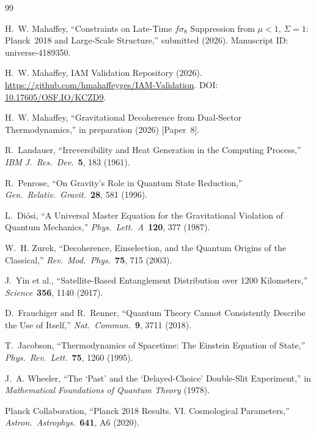 \documentclass[12pt,letterpaper]{article}
\begin{document}

\begin{thebibliography}{99}

H.~W. Mahaffey,
``Constraints on Late-Time $f\sigma_8$ Suppression from $\mu < 1$,
$\Sigma = 1$: Planck~2018 and Large-Scale Structure,''
submitted (2026). Manuscript ID: universe-4189350.

H.~W. Mahaffey,
IAM Validation Repository (2026).
\url{https://github.com/hmahaffeyges/IAM-Validation}.
DOI: \href{https://doi.org/10.17605/OSF.IO/KCZD9}{10.17605/OSF.IO/KCZD9}.

H.~W. Mahaffey,
``Gravitational Decoherence from Dual-Sector Thermodynamics,''
in preparation (2026) [Paper~8].

R.~Landauer,
``Irreversibility and Heat Generation in the Computing Process,''
\textit{IBM J.\ Res.\ Dev.}\ \textbf{5}, 183 (1961).

R.~Penrose,
``On Gravity's Role in Quantum State Reduction,''
\textit{Gen.\ Relativ.\ Gravit.}\ \textbf{28}, 581 (1996).

L.~Di\'{o}si,
``A Universal Master Equation for the Gravitational Violation of Quantum
Mechanics,''
\textit{Phys.\ Lett.\ A}\ \textbf{120}, 377 (1987).

W.~H. Zurek,
``Decoherence, Einselection, and the Quantum Origins of the Classical,''
\textit{Rev.\ Mod.\ Phys.}\ \textbf{75}, 715 (2003).

J.~Yin et al.,
``Satellite-Based Entanglement Distribution over 1200 Kilometers,''
\textit{Science}\ \textbf{356}, 1140 (2017).

D.~Frauchiger and R.~Renner,
``Quantum Theory Cannot Consistently Describe the Use of Itself,''
\textit{Nat.\ Commun.}\ \textbf{9}, 3711 (2018).

T.~Jacobson,
``Thermodynamics of Spacetime: The Einstein Equation of State,''
\textit{Phys.\ Rev.\ Lett.}\ \textbf{75}, 1260 (1995).

J.~A. Wheeler,
``The `Past' and the `Delayed-Choice' Double-Slit Experiment,''
in \textit{Mathematical Foundations of Quantum Theory} (1978).

Planck Collaboration,
``Planck 2018 Results. VI. Cosmological Parameters,''
\textit{Astron.\ Astrophys.}\ \textbf{641}, A6 (2020).

\end{thebibliography}
\end{document}
